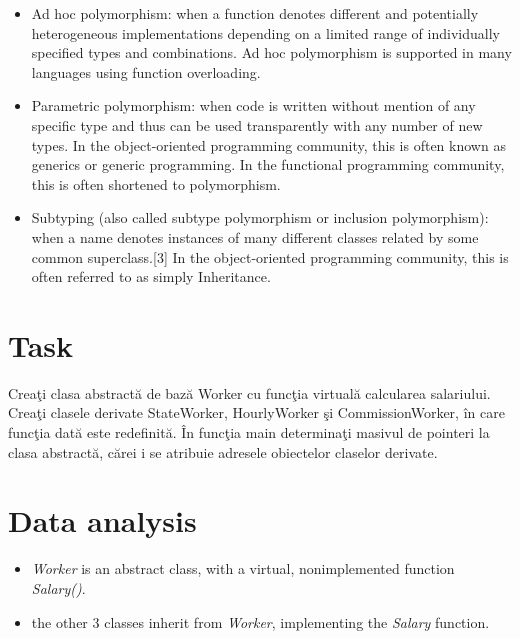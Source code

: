 \documentclass{article}
\begin{document}
		\begin{itemize}
			\item Ad hoc polymorphism: when a function denotes different and potentially heterogeneous implementations depending on a limited range of individually specified types and combinations. Ad hoc polymorphism is supported in many languages using function overloading.

			\item Parametric polymorphism: when code is written without mention of any specific type and thus can be used transparently with any number of new types. In the object-oriented programming community, this is often known as generics or generic programming. In the functional programming community, this is often shortened to polymorphism.

			\item Subtyping (also called subtype polymorphism or inclusion polymorphism): when a name denotes instances of many different classes related by some common superclass.[3] In the object-oriented programming community, this is often referred to as simply Inheritance.
		\end{itemize}

	\section{Task}
		\par Creaţi clasa abstractă de bază Worker cu funcţia virtuală calcularea salariului. Creaţi clasele derivate StateWorker, HourlyWorker şi CommissionWorker, în care funcţia dată este redefinită. În funcţia main determinaţi masivul de pointeri la clasa abstractă, cărei i se atribuie adresele obiectelor claselor derivate.

	\section{Data analysis}
		\begin{itemize}
			\item \textit{Worker} is an abstract class, with a virtual, nonimplemented function \textit{Salary()}.

			\item the other 3 classes inherit from \textit{Worker}, implementing the \textit{Salary} function.
		\end{itemize}
\end{document}

